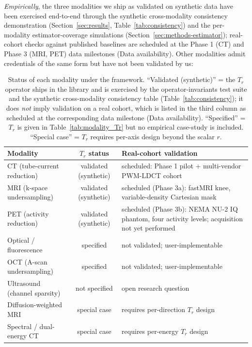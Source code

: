 \documentclass[twoside,11pt]{article}
\begin{document}
\textit{Empirically}, the three modalities we ship as validated on synthetic data have been exercised end-to-end through the synthetic cross-modality consistency demonstration (Section~\ref{sec:results}, Table~\ref{tab:consistency}) and the per-modality estimator-coverage simulations (Section~\ref{sec:methods-estimator}); real-cohort checks against published baselines are scheduled at the Phase 1 (CT) and Phase 3 (MRI, PET) data milestones (Data availability). Other modalities admit credentials of the same form but have not been validated by us:

\begin{table}[ht]
    \centering
    \small
    \begin{tabular}{lcl}
        \toprule
        \textbf{Modality} & \textbf{$T_r$ status} & \textbf{Real-cohort validation} \\
        \midrule
        CT (tube-current reduction)      & validated (synthetic) & scheduled: Phase 1 pilot + multi-vendor PWM-LDCT cohort \\
        MRI (k-space undersampling)      & validated (synthetic) & scheduled (Phase 3a): fastMRI knee, variable-density Cartesian mask \\
        PET (activity reduction)         & validated (synthetic) & scheduled (Phase 3b): NEMA NU-2 IQ phantom, four activity levels; acquisition not yet performed \\
        Optical / fluorescence           & specified     & not validated; user-implementable \\
        OCT (A-scan undersampling)       & specified     & not validated; user-implementable \\
        Ultrasound (channel sparsity)    & not specified & open research question \\
        Diffusion-weighted MRI           & special case  & requires per-direction $T_r$ design \\
        Spectral / dual-energy CT        & special case  & requires per-energy $T_r$ design \\
        \bottomrule
    \end{tabular}
    \caption{Status of each modality under the framework. ``Validated (synthetic)'' = the $T_r$ operator ships in the library and is exercised by the operator-invariants test suite and the synthetic cross-modality consistency table (Table~\ref{tab:consistency}); it does \emph{not} imply validation on a real cohort, which is listed in the third column as scheduled at the corresponding data milestone (Data availability). ``Specified'' = $T_r$ is given in Table~\ref{tab:modality_Tr} but no empirical case-study is included. ``Special case'' = $T_r$ requires per-axis design beyond the scalar $r$.}
    \label{tab:modality_status}
\end{table}
\end{document}
